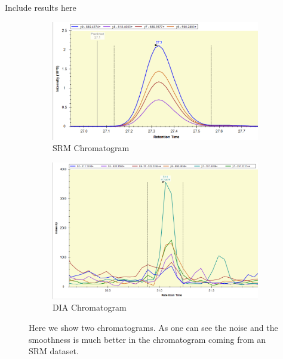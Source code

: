 \documentclass[12pt]{article}
\begin{document}
\color{red}
Include results here
\color{black}

\begin{figure}
\centering
\begin{subfigure}{.5\textwidth}
  \centering
  \includegraphics[width=1\linewidth]{smoothExample.png}
  \caption{SRM Chromatogram}
  \label{fig:sub1}
\end{subfigure}%
\begin{subfigure}{.5\textwidth}
  \centering
  \includegraphics[width=1\linewidth]{DIA_example}
  \caption{DIA Chromatogram}
  \label{fig:sub2}
\end{subfigure}
\caption{Here we show two chromatograms. As one can see the noise and the smoothness is much better in the chromatogram coming from an SRM dataset.}
\label{fig:test}
\end{figure}
\end{document}
